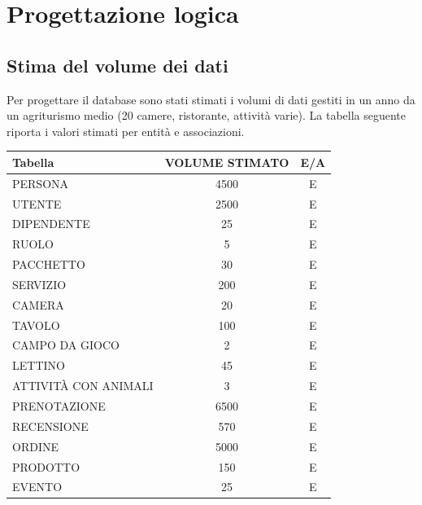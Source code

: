 \documentclass[a4paper,12pt]{report}
\begin{document}
\chapter{Progettazione logica}
\section{Stima del volume dei dati}
Per progettare il database sono stati stimati i volumi di dati gestiti in un anno da un agriturismo
medio (20 camere, ristorante, attività varie). La tabella seguente riporta i valori stimati per entità
e associazioni.
\begin{table}[H]
	\centering
	\small
	\renewcommand{\arraystretch}{1.15}
	\begin{tabularx}{\textwidth}{|X|c|c|}
		\hline
		\rowcolor{gray!20}
		\textbf{Tabella}       & \textbf{VOLUME STIMATO} & \textbf{E/A} \\
		\hline
		PERSONA                & 4500                    & E            \\
		UTENTE                 & 2500                    & E            \\
		DIPENDENTE             & 25                      & E            \\
		RUOLO                  & 5                       & E            \\
		PACCHETTO              & 30                      & E            \\
		SERVIZIO               & 200                     & E            \\
		CAMERA                 & 20                      & E            \\
		TAVOLO                 & 100                     & E            \\
		CAMPO DA GIOCO         & 2                       & E            \\
		LETTINO                & 45                      & E            \\
		ATTIVITÀ CON ANIMALI   & 3                       & E            \\
		PRENOTAZIONE           & 6500                    & E            \\
		RECENSIONE             & 570                     & E            \\
		ORDINE                 & 5000                    & E            \\
		PRODOTTO               & 150                     & E            \\
		EVENTO                 & 25                      & E            \\

\end{tabularx}
\end{table}
\end{document}
